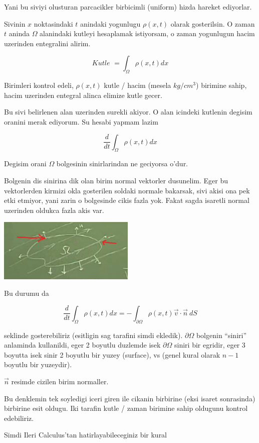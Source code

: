 \documentclass[12pt,fleqn]{article}\usepackage{../common}
\begin{document}
Yani bu siviyi olusturan parcacikler birbicimli (uniform) hizda hareket
ediyorlar. 

Sivinin $x$ noktasindaki $t$ anindaki yogunlugu $\rho(x,t)$ olarak
gosterilsin. O zaman $t$ aninda $\Omega$ alanindaki kutleyi hesaplamak
istiyorsam, o zaman yogunlugun hacim uzerinden entegralini alirim. 

\[ \textit{Kutle } = \int_\Omega \rho(x,t) dx \]

Birimleri kontrol edeli, $\rho(x,t)$ kutle / hacim (mesela $kg / cm^3$)
birimine sahip, hacim uzerinden entegral alinca elimize kutle gecer. 

Bu sivi belirlenen alan uzerinden surekli akiyor. O alan icindeki kutlenin
degisim oranini merak ediyorum. Su hesabi yapmam lazim

\[ \frac{d}{dt} \int_\Omega \rho(x,t) dx   \]


Degisim orani $\Omega$ bolgesinin sinirlarindan ne geciyorsa o'dur. 

Bolgenin dis sinirina dik olan birim normal vektorler dusunelim. Eger bu
vektorlerden kirmizi okla gosterilen soldaki normale bakarsak, sivi akisi
ona pek etki etmiyor, yani zarin o bolgesinde cikis fazla yok. Fakat sagda
isaretli normal uzerinden oldukca fazla akis var.

\includegraphics[height=3cm]{1_2.png}

Bu durumu da

\[ \frac{d}{dt} \int_\Omega \rho(x,t) dx   = 
- \int_{\partial \Omega} \rho(x,t) \vec{v} \cdot \vec{n} \ dS 
\]

seklinde gosterebiliriz (esitligin sag tarafini simdi ekledik). $\partial
\Omega$ bolgenin 
``siniri'' anlaminda kullanildi, eger 2 boyutlu duzlemde isek
$\partial \Omega$ siniri bir egridir, eger 3 boyutta isek sinir 2 boyutlu bir
yuzey (surface), vs (genel kural olarak $n-1$ boyutlu bir yuzeydir).

$\vec{n}$ resimde cizilen birim normaller. 

Bu denklemin tek soyledigi iceri giren ile cikanin birbirine (eksi isaret
sonrasinda) birbirine esit oldugu. Iki tarafin kutle / zaman birimine sahip
oldugunu kontrol edebiliriz. 

Simdi Ileri Calculus'tan hatirlayabileceginiz bir kural 
\end{document}
